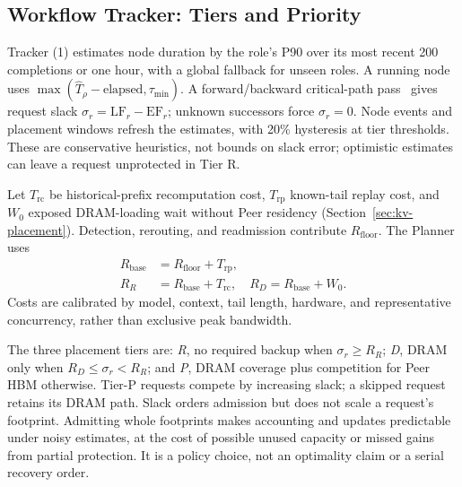 \subsection{Workflow Tracker: Tiers and Priority}
\label{sec:workflow-protection}

Tracker (1) estimates node duration by the role's P90 over its most
recent 200 completions or one hour, with a global fallback for unseen
roles. A running node uses $\max(\widehat T_\rho-\mathrm{elapsed},\tau_{\min})$.
A forward/backward critical-path pass~\cite{kelley1959cpm} gives request
slack $\sigma_r=\mathrm{LF}_r-\mathrm{EF}_r$; unknown successors force
$\sigma_r=0$. Node events and placement windows refresh the estimates,
with 20\% hysteresis at tier thresholds. These are conservative
heuristics, not bounds on slack error; optimistic estimates can leave
a request unprotected in Tier R.

Let $T_{\mathrm{rc}}$ be historical-prefix recomputation cost,
$T_{\mathrm{rp}}$ known-tail replay cost, and $W_0$ exposed DRAM-loading
wait without Peer residency (Section~\ref{sec:kv-placement}).
Detection, rerouting, and readmission contribute $R_{\mathrm{floor}}$.
The Planner uses
\begin{equation}
\begin{aligned}
 R_{\mathrm{base}}&=R_{\mathrm{floor}}+T_{\mathrm{rp}},\\
 R_R&=R_{\mathrm{base}}+T_{\mathrm{rc}},\quad
 R_D=R_{\mathrm{base}}+W_0.
\end{aligned}
\label{eq:recovery-base}
\end{equation}
Costs are calibrated by model, context, tail length, hardware, and
representative concurrency, rather than exclusive peak bandwidth.

The three placement tiers are:
\emph{R}, no required backup when $\sigma_r\ge R_R$;
\emph{D}, DRAM only when $R_D\le\sigma_r<R_R$;
and \emph{P}, DRAM coverage plus competition for Peer HBM otherwise.
Tier-P requests compete by increasing slack; a skipped request retains
its DRAM path. Slack orders admission but does not scale a request's
footprint. Admitting whole footprints makes accounting and updates
predictable under noisy estimates, at the cost of possible unused
capacity or missed gains from partial protection. It is a policy choice,
not an optimality claim or a serial recovery order.
